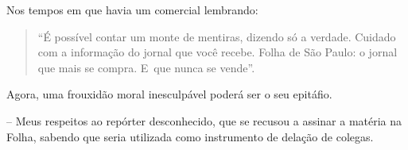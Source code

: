Nos tempos em que havia um comercial lembrando:

\begin{quote}
``É possível contar um monte de mentiras, dizendo só a verdade. Cuidado
com a informação do jornal que você recebe. Folha de São Paulo: o jornal
que mais se compra. E~que nunca se vende''.
\end{quote}

Agora, uma frouxidão moral inesculpável poderá ser o seu epitáfio.

 -- Meus respeitos ao repórter desconhecido, que se recusou a assinar
a matéria na Folha, sabendo que seria utilizada como instrumento de
delação de colegas.
